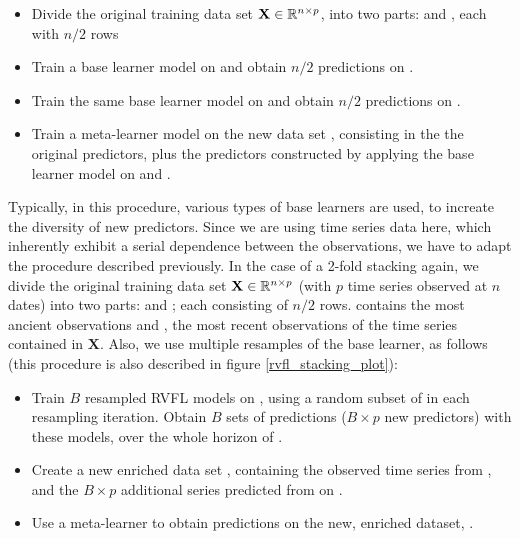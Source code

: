 \begin{itemize}
\item Divide the original training data set $\textbf{X} \in \mathbb{R}^{n \times p}$, into two parts:  and , each with $n/2$ rows
\item Train a base learner model on  and obtain $n/2$ predictions on .
\item Train the same base learner model on  and obtain $n/2$ predictions on .
\item Train a  meta-learner model on the new data set , consisting in the the original predictors, plus the predictors constructed by applying the base learner model on  and .
\end{itemize}
\medskip

Typically, in this procedure, various types of base learners are used, to increate the diversity of new predictors. Since we are using time series data here, which inherently exhibit a serial dependence between the observations, we have to adapt the procedure described previously. In the case of a 2-fold stacking again, we divide the original training data set  $\textbf{X} \in \mathbb{R}^{n \times p}$ (with $p$ time series observed at $n$ dates) into two parts:  and ; each consisting of $n/2$ rows.  contains the most ancient observations and , the most recent observations of the time series contained in $\textbf{X}$. Also, we use multiple resamples of the base learner, as follows (this procedure is also described in figure \ref{rvfl_stacking_plot}):

\begin{itemize}
\item Train $B$ resampled RVFL models on , using a random subset of  in each resampling iteration. Obtain $B$ sets of predictions ($B \times p$ new predictors) with these models, over the whole horizon  of .
\item Create a new enriched data set , containing the observed time series from , and the $B \times p$ additional series predicted from  on .
\item Use a meta-learner to obtain predictions on the new, enriched dataset, .
\end{itemize}

\newpage


